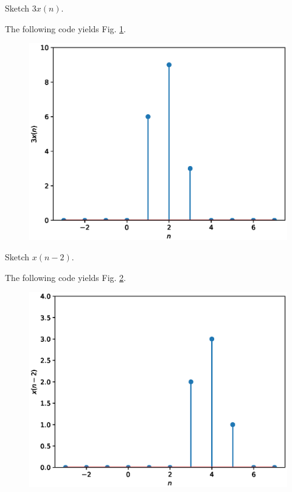 \documentclass[journal,12pt,twocolumn]{IEEEtran}
\begin{document}
%
\begin{problem}
Sketch $3x(n)$.
\end{problem}
\solution The following code yields Fig. \ref{fig_3b}.

\begin{figure}[!h]
\begin{center}
\includegraphics[width=\columnwidth]{./figs/3b}
\end{center}
\label{fig_3b}	
\end{figure}
%
\begin{problem}
Sketch $x(n-2)$.
\end{problem}
\solution The following code yields Fig. \ref{fig_3c}.

\begin{figure}[!h]
\begin{center}
\includegraphics[width=\columnwidth]{./figs/3c}
\end{center}
\label{fig_3c}	
\end{figure}
\end{document}
